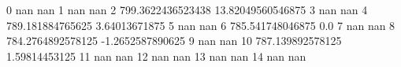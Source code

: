 0 nan nan
1 nan nan
2 799.3622436523438 13.82049560546875
3 nan nan
4 789.181884765625 3.64013671875
5 nan nan
6 785.541748046875 0.0
7 nan nan
8 784.2764892578125 -1.2652587890625
9 nan nan
10 787.139892578125 1.59814453125
11 nan nan
12 nan nan
13 nan nan
14 nan nan
